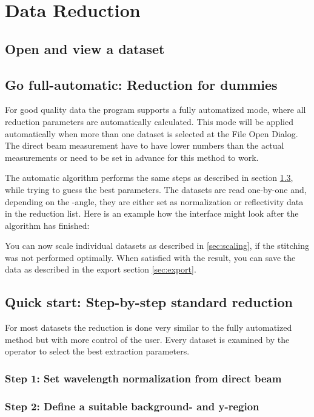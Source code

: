 \chapter{Data Reduction}
\label{chap:data_reduction}

\section{Open and view a dataset}


\section{Go full-automatic: Reduction for dummies}
  For good quality data the program supports a fully automatized mode, where all reduction parameters are automatically calculated.
  This mode will be applied automatically when more than one dataset is selected at the File Open Dialog.
  The direct beam measurement have to have lower numbers than the actual measurements or need to be set in advance for this method to work.
  
  The automatic algorithm performs the same steps as described in section \ref{sec:quick_start}, while trying to guess the best parameters.
  The datasets are read one-by-one and, depending on the \tth-angle, they are either set as normalization or reflectivity data in the reduction list.
  Here is an example how the interface might look after the algorithm has finished:
  
  
  You can now scale individual datasets as described in \ref{sec:scaling}, if the stitching was not performed optimally.
  When satisfied with the result, you can save the data as described in the export section \ref{sec:export}.
  

\section{Quick start: Step-by-step standard reduction}
\label{sec:quick_start}
  For most datasets the reduction is done very similar to the fully automatized method but with more control of the user.
  Every dataset is examined by the operator to select the best extraction parameters.
  
  \subsection{Step 1: Set wavelength normalization from direct beam}
  
  \subsection{Step 2: Define a suitable background- and y-region}
  
